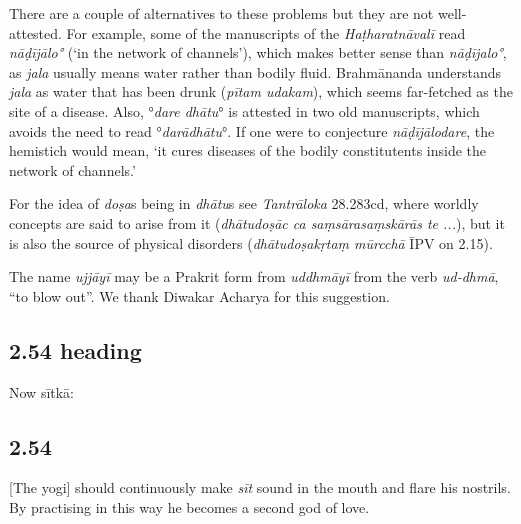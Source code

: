 \begin{ekdosis}
\begin{philcomm}[hp02_053]
There are a couple of alternatives to these problems but they are not well-attested. For example, some of the manuscripts of the \emph{Haṭharatnāvalī} read \emph{nāḍījālo°} (‘in the network of channels’), which makes better sense than \emph{nāḍījalo°}, as \emph{jala} usually means water rather than bodily fluid. Brahmānanda understands \emph{jala} as water that has been drunk (\emph{pītam udakam}), which seems far-fetched as the site of a disease. Also, °\emph{dare dhātu}° is attested in two old manuscripts, which avoids the need to read °\emph{darādhātu}°. If one were to conjecture \emph{nāḍījālodare}, the hemistich would mean, `it cures diseases of the bodily constitutents inside the network of channels.'\lb   




For the idea of \emph{doṣa}s being in \emph{dhātu}s see \emph{Tantrāloka} 28.283cd, where worldly concepts are said to arise from it (\emph{dhātudoṣāc ca saṃsārasaṃskārās te ...}), but it is also the source of physical disorders (\emph{dhātudoṣakṛtaṃ mūrcchā} ĪPV on 2.15).\lb

The name \emph{ujjāyī} may be a Prakrit form from \emph{uddhmāyī} from the verb \emph{ud-dhmā}, “to blow out”. We thank Diwakar Acharya for this suggestion.

\end{philcomm}

\subsection*{2.54 heading}
\begin{translation}[hp02_054a]
Now sītkā:
\end{translation}


\subsection*{2.54}
\begin{translation}[hp02_054]
{[}The yogi] should continuously make \emph{sīt} sound in the mouth and flare his nostrils. By practising in this way he becomes a second god of love.
\end{translation} 


\end{ekdosis}
